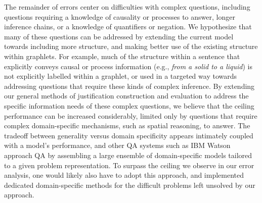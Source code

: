 The remainder of errors center on difficulties with complex questions, including questions requiring a knowledge of causality or processes to answer, longer inference chains, or a knowledge of quantifiers or negation.  We hypothesize that many of these questions can be addressed by extending the current model towards including more structure, and making better use of the existing structure within graphlets.  For example, much of the structure within a sentence that explicitly conveys causal or process information (e.g., \emph{from a solid to a liquid}) is not explicitly labelled within a graphlet, or used in a targeted way towards addressing questions that require these kinds of complex inference.  By extending our general methods of justification construction and evaluation to address the specific information needs of these complex questions, we believe that the ceiling performance can be increased considerably, limited only by questions that require complex domain-specific mechanisms, such as spatial reasoning, to answer.  The tradeoff between generality versus domain specificity appears intimately coupled with a model's performance, and other QA systems such as IBM Watson approach QA by assembling a large ensemble of domain-specific models tailored to a given problem representation. 
To surpass the ceiling we observe in our error analysis, one would likely also have to adopt this approach, and implemented dedicated domain-specific methods for the difficult problems left unsolved by our approach. 








 
